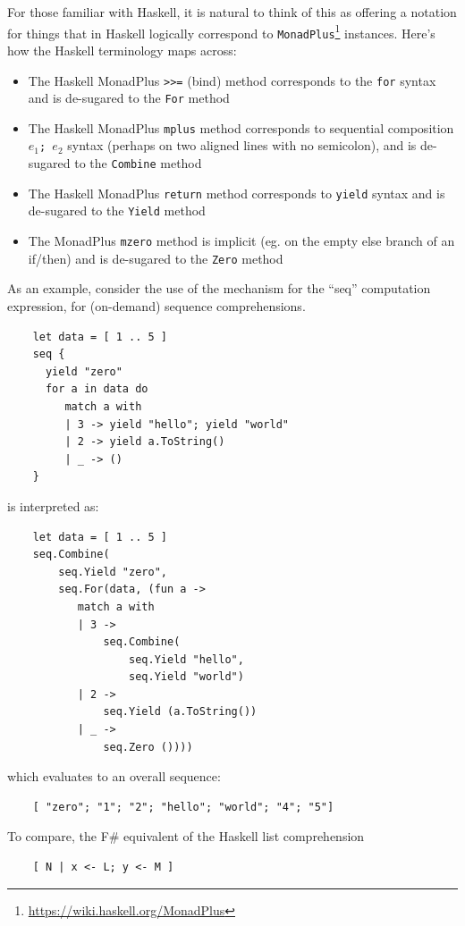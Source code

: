 \documentclass[acmsmall]{acmart}\settopmatter{}
\begin{document}
For those familiar with Haskell, it is natural to think of this as offering a notation for things that in Haskell logically
correspond to \texttt{MonadPlus}\footnote{\url{https://wiki.haskell.org/MonadPlus}} instances.  Here’s how the Haskell terminology maps across:
\begin{itemize}
\item The Haskell MonadPlus \texttt{>>=} (bind) method corresponds to the \texttt{for} syntax and is de-sugared to the \texttt{For} method

\item The Haskell MonadPlus \texttt{mplus} method corresponds to sequential composition \texttt{$e_1$; $e_2$} syntax (perhaps on two aligned lines with no semicolon), and is de-sugared to the \texttt{Combine} method

\item The Haskell MonadPlus \texttt{return} method corresponds to \texttt{yield} syntax and is de-sugared to the \texttt{Yield} method

\item The MonadPlus \texttt{mzero} method is implicit (eg. on the empty else branch of an if/then) and is de-sugared to the \texttt{Zero} method
\end{itemize}
As an example, consider the use of the mechanism for the “seq” computation expression, for (on-demand) sequence comprehensions. 
\begin{verbatim}
    let data = [ 1 .. 5 ]
    seq {
      yield "zero"
      for a in data do
         match a with
         | 3 -> yield "hello"; yield "world"
         | 2 -> yield a.ToString() 
         | _ -> () 
    }
\end{verbatim}
is interpreted as:
\begin{verbatim}
    let data = [ 1 .. 5 ]
    seq.Combine(
        seq.Yield "zero",
        seq.For(data, (fun a ->
           match a with
           | 3 -> 
               seq.Combine(
                   seq.Yield "hello", 
                   seq.Yield "world")
           | 2 ->
               seq.Yield (a.ToString())
           | _ ->
               seq.Zero ())))
\end{verbatim}
which evaluates to an overall sequence:
\begin{verbatim}
    [ "zero"; "1"; "2"; "hello"; "world"; "4"; "5"] 
\end{verbatim}
To compare, the F\# equivalent of the Haskell list comprehension
\begin{verbatim}
    [ N | x <- L; y <- M ]  
\end{verbatim}
\end{document}
